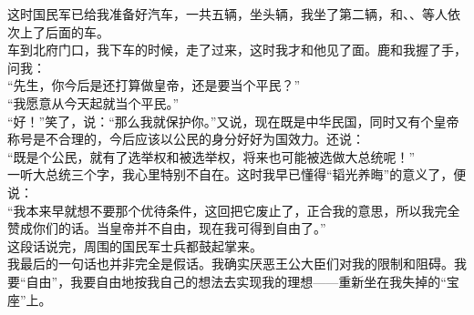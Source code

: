 这时国民军已给我准备好汽车，一共五辆，坐头辆，我坐了第二辆，和、、等人依次上了后面的车。\\

车到北府门口，我下车的时候，走了过来，这时我才和他见了面。鹿和我握了手，问我：\\

“先生，你今后是还打算做皇帝，还是要当个平民？”\\

“我愿意从今天起就当个平民。”\\

“好！”笑了，说：“那么我就保护你。”又说，现在既是中华民国，同时又有个皇帝称号是不合理的，今后应该以公民的身分好好为国效力。还说：\\

“既是个公民，就有了选举权和被选举权，将来也可能被选做大总统呢！”\\

一听大总统三个字，我心里特别不自在。这时我早已懂得“韬光养晦”的意义了，便说：\\

“我本来早就想不要那个优待条件，这回把它废止了，正合我的意思，所以我完全赞成你们的话。当皇帝并不自由，现在我可得到自由了。”\\

这段话说完，周围的国民军士兵都鼓起掌来。\\

我最后的一句话也并非完全是假话。我确实厌恶王公大臣们对我的限制和阻碍。我要“自由”，我要自由地按我自己的想法去实现我的理想——重新坐在我失掉的“宝座”上。
